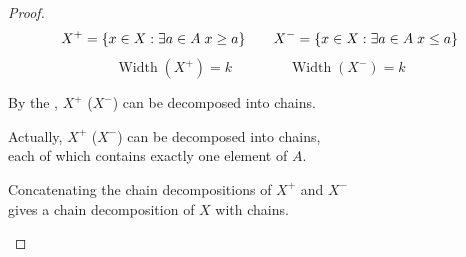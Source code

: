 \begin{frame}{}
  \begin{proof}
    \vspace{-0.50cm}
    \[
      X^{+} = \{x \in X: \exists a \in A\; x \ge a\}
      \qquad
      X^{-} = \{x \in X: \exists a \in A\; x \le a\}
    \]
    \vspace{-0.80cm}
    \vspace{-0.30cm}
    {\small
    \pause
    \vspace{-0.30cm}
    \[
      \operatorname{Width}(X^{+}) = k
      \qquad\qquad
      \operatorname{Width}(X^{-}) = k
    \]}
    \pause
    \vspace{-0.60cm}
    \begin{center}
      {\small
      By the ,
      $X^{+}$ ($X^{-}$) can be decomposed into  chains.}

      \pause
      \vspace{0.50cm}
      {\small
      Actually, $X^{+}$ ($X^{-}$) can be decomposed into  chains, \\[3pt]
      each of which contains exactly one element of $A$.}

      \pause
      \vspace{0.50cm}
      {\small Concatenating the chain decompositions of $X^{+}$ and $X^{-}$ \\[3pt]
      gives a chain decomposition of $X$ with  chains.}
    \end{center}
  \end{proof}
\end{frame}

